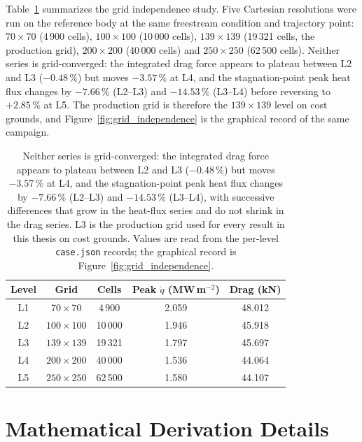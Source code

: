 Table~\ref{tab:grid_study} summarizes the grid independence study. Five Cartesian resolutions were run on the reference body at the same freestream condition and trajectory point: $70\times70$ (4\,900 cells), $100\times100$ (10\,000 cells), $139\times139$ (19\,321 cells, the production grid), $200\times200$ (40\,000 cells) and $250\times250$ (62\,500 cells). Neither series is grid-converged: the integrated drag force appears to plateau between L2 and L3 ($-0.48\,\%$) but moves $-3.57\,\%$ at L4, and the stagnation-point peak heat flux changes by $-7.66\,\%$ (L2--L3) and $-14.53\,\%$ (L3--L4) before reversing to $+2.85\,\%$ at L5. The production grid is therefore the $139\times139$ level on cost grounds, and Figure~\ref{fig:grid_independence} is the graphical record of the same campaign.

\begin{table}[H]
\centering
\caption{Grid independence study: surface quantities across five refinement levels.}
\label{tab:grid_study}
\begin{tabular}{ccccc}
\hline
\textbf{Level} & \textbf{Grid} & \textbf{Cells} & \textbf{Peak $\dot q$ (MW\,m$^{-2}$)} & \textbf{Drag (kN)} \\
\hline
L1 & $70\times70$ & 4\,900 & 2.059 & 48.012 \\
L2 & $100\times100$ & 10\,000 & 1.946 & 45.918 \\
L3 & $139\times139$ & 19\,321 & 1.797 & 45.697 \\
L4 & $200\times200$ & 40\,000 & 1.536 & 44.064 \\
L5 & $250\times250$ & 62\,500 & 1.580 & 44.107 \\
\hline
\end{tabular}
\caption*{Neither series is grid-converged: the integrated drag force appears to plateau between L2 and L3 ($-0.48\,\%$) but moves $-3.57\,\%$ at L4, and the stagnation-point peak heat flux changes by $-7.66\,\%$ (L2--L3) and $-14.53\,\%$ (L3--L4), with successive differences that grow in the heat-flux series and do not shrink in the drag series. L3 is the production grid used for every result in this thesis on cost grounds. Values are read from the per-level \texttt{case.json} records; the graphical record is Figure~\ref{fig:grid_independence}.}
\end{table}

\chapter{Mathematical Derivation Details}
\label{app:derivations}

